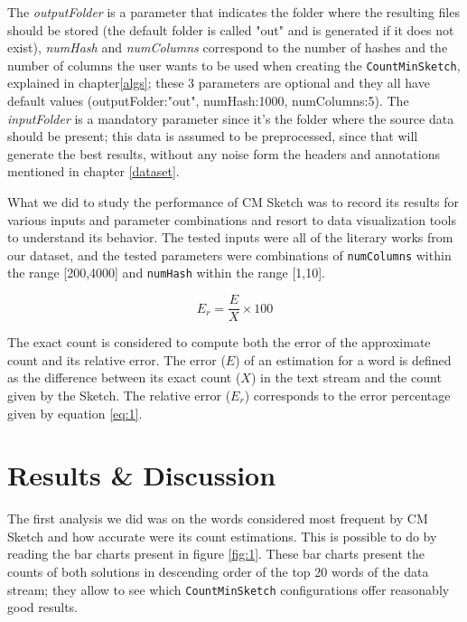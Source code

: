\documentclass[shortpaper]{revdetua}
\begin{document}
The \textit{outputFolder} is a parameter that indicates the folder where the resulting files should be stored (the default folder is called "out" and is 
generated if it does not exist), \textit{numHash} and \textit{numColumns} correspond to the number of hashes and the number of columns the user wants to be used 
when creating the \texttt{CountMinSketch}, explained in chapter\ref{algs}; these 3 parameters are optional and they all have default values 
(outputFolder:"out", numHash:1000, numColumns:5).
The \textit{inputFolder} is a mandatory parameter since it's the folder where the source data should be present; this data is assumed to be preprocessed, 
since that will generate the best results, without any noise form the headers and annotations mentioned in chapter \ref{dataset}.
\newline

What we did to study the performance of CM Sketch was to record its results for various inputs and parameter combinations and resort to data visualization tools 
to understand its behavior.
The tested inputs were all of the literary works from our dataset, and the tested parameters were combinations of \texttt{numColumns} within the range [200,4000] 
and \texttt{numHash} within the range [1,10].

\begin{equation}
    E_{r} = \frac{E}{X} \times 100
    \label{eq:1}
\end{equation}

\newpage
The exact count is considered to compute both the error of the approximate count and its relative error.
The error ($E$) of an estimation for a word is defined as the difference between its exact count ($X$) in the text stream and the count given by the Sketch.
The relative error ($E_r$) corresponds to the error percentage given by equation \ref{eq:1}.

\section{Results \& Discussion} %

The first analysis we did was on the words considered most frequent by CM Sketch and how accurate were its count estimations.
This is possible to do by reading the bar charts present in figure \ref{fig:1}.
These bar charts present the counts of both solutions in descending order of the top 20 words of the data stream; they allow to see which \texttt{CountMinSketch}
configurations offer reasonably good results.
\end{document}
